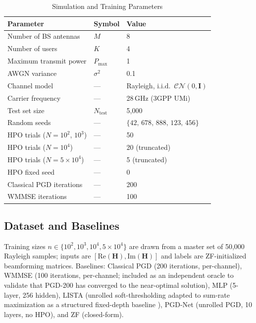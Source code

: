 \documentclass[conference,11pt]{IEEEtran}
\begin{document}
\begin{table}[htbp]
\caption{Simulation and Training Parameters}
\label{tab:sim_params}
\begin{center}
\begin{tabular}{l l l}
\toprule
Parameter & Symbol & Value \\
\midrule
Number of BS antennas & $M$ & 8 \\
Number of users & $K$ & 4 \\
Maximum transmit power & $P_{\max}$ & 1 \\
AWGN variance & $\sigma^2$ & 0.1 \\
Channel model & --- & Rayleigh, i.i.d.\ $\mathcal{CN}(0,\mathbf{I})$ \\
Carrier frequency & --- & 28\,GHz (3GPP UMi) \\
Test set size & $N_{\text{test}}$ & 5{,}000 \\
Random seeds & --- & $\{42,\,678,\,888,\,123,\,456\}$ \\
HPO trials ($N{=}10^2$, $10^3$) & --- & 50 \\
HPO trials ($N{=}10^4$) & --- & 20 (truncated) \\
HPO trials ($N{=}5\!\times\!10^4$) & --- & 5 (truncated) \\
HPO fixed seed & --- & 0 \\
Classical PGD iterations & --- & 200 \\
WMMSE iterations & --- & 100 \\
\bottomrule
\end{tabular}
\end{center}
\end{table}

\subsection{Dataset and Baselines}
Training sizes $n\in\{10^2,10^3,10^4,5\!\times\!10^4\}$ are drawn from a master set of 50,000 Rayleigh samples; inputs are $[\text{Re}(\mathbf{H}),\text{Im}(\mathbf{H})]$ and labels are ZF-initialized beamforming matrices. Baselines: Classical PGD (200 iterations, per-channel), WMMSE \cite{shi2011wmmse} (100 iterations, per-channel; included as an independent oracle to validate that PGD-200 has converged to the near-optimal solution), MLP (5-layer, 256 hidden), LISTA (unrolled soft-thresholding adapted to sum-rate maximization as a structured fixed-depth baseline \cite{gregor2010lista}), PGD-Net (unrolled PGD, 10 layers, no HPO), and ZF (closed-form).
\end{document}

